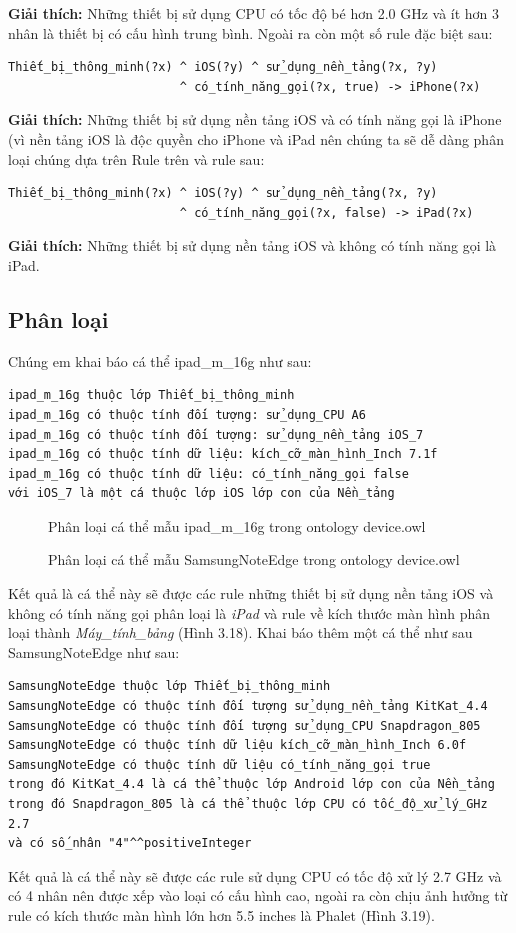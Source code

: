 {\begin{verbatim}
\end{verbatim}
\textbf{Giải thích:} Những thiết bị sử dụng CPU có tốc độ bé hơn 2.0 GHz và ít hơn 3 nhân là thiết bị có cấu hình trung bình. Ngoài ra còn một số rule đặc biệt sau:
\begin{verbatim}
Thiết_bị_thông_minh(?x) ^ iOS(?y) ^ sử_dụng_nền_tảng(?x, ?y) 
						^ có_tính_năng_gọi(?x, true) -> iPhone(?x)
\end{verbatim}
\textbf{Giải thích:} Những thiết bị sử dụng nền tảng iOS và có tính năng gọi là iPhone (vì nền tảng iOS là độc quyền cho iPhone và iPad nên chúng ta sẽ dễ dàng phân loại chúng dựa trên Rule trên và rule sau:
\begin{verbatim}
Thiết_bị_thông_minh(?x) ^ iOS(?y) ^ sử_dụng_nền_tảng(?x, ?y) 
						^ có_tính_năng_gọi(?x, false) -> iPad(?x)
\end{verbatim}
\textbf{Giải thích:} Những thiết bị sử dụng nền tảng iOS và không có tính năng gọi là iPad.
\subsection{Phân loại}
Chúng em khai báo cá thể ipad\_m\_16g như sau:
\begin{verbatim}
ipad_m_16g thuộc lớp Thiết_bị_thông_minh
ipad_m_16g có thuộc tính đối tượng: sử_dụng_CPU A6
ipad_m_16g có thuộc tính đối tượng: sử_dụng_nền_tảng iOS_7
ipad_m_16g có thuộc tính dữ liệu: kích_cỡ_màn_hình_Inch 7.1f
ipad_m_16g có thuộc tính dữ liệu: có_tính_năng_gọi false
với iOS_7 là một cá thuộc lớp iOS lớp con của Nền_tảng 
\end{verbatim}
\begin{figure}[h!]
	\centering
	\caption{Phân loại cá thể mẫu ipad\_m\_16g trong ontology device.owl\label{overflow}}
\end{figure}
\begin{figure}[H]
	\centering
	\caption{Phân loại cá thể mẫu SamsungNoteEdge trong ontology device.owl\label{overflow}}
\end{figure}
Kết quả là cá thể này sẽ được các rule những thiết bị sử dụng nền tảng iOS và không có tính năng gọi phân loại là \textit{iPad} và rule về kích thước màn hình phân loại thành \textit{Máy\_tính\_bảng} (Hình 3.18). Khai báo thêm một cá thể như sau SamsungNoteEdge như sau:
\begin{verbatim}
SamsungNoteEdge thuộc lớp Thiết_bị_thông_minh
SamsungNoteEdge có thuộc tính đối tượng sử_dụng_nền_tảng KitKat_4.4
SamsungNoteEdge có thuộc tính đối tượng sử_dụng_CPU Snapdragon_805
SamsungNoteEdge có thuộc tính dữ liệu kích_cỡ_màn_hình_Inch 6.0f
SamsungNoteEdge có thuộc tính dữ liệu có_tính_năng_gọi true
trong đó KitKat_4.4 là cá thể thuộc lớp Android lớp con của Nền_tảng
trong đó Snapdragon_805 là cá thể thuộc lớp CPU có tốc_độ_xử_lý_GHz 2.7
và có số_nhân "4"^^positiveInteger
\end{verbatim}
Kết quả là cá thể này sẽ được các rule sử dụng CPU có tốc độ xử lý 2.7 GHz và có 4 nhân nên được xếp vào loại có cấu hình cao, ngoài ra còn chịu ảnh hưởng từ rule có kích thước màn hình lớn hơn 5.5 inches là Phalet (Hình 3.19).
}

